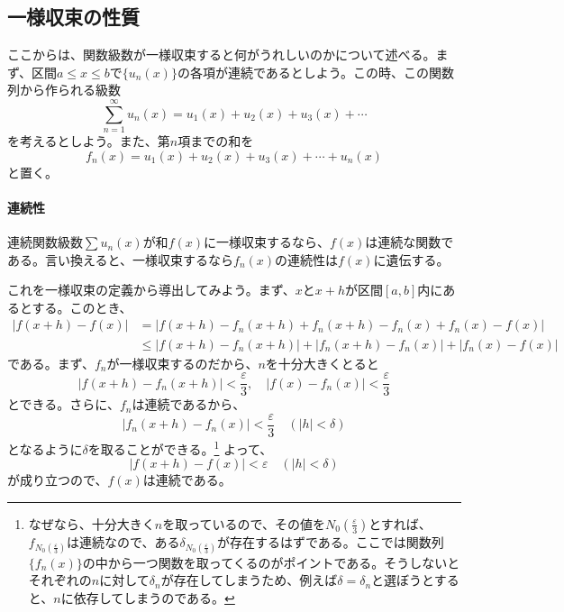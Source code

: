 \documentclass[a4j,dvipdfmx]{jsarticle}
\begin{document}
            \subsection{一様収束の性質}
                ここからは、関数級数が一様収束すると何がうれしいのかについて述べる。まず、区間$a\leq x\leq b$で$\{u_n(x)\}$の各項が連続であるとしよう。この時、この関数列から作られる級数
                \begin{equation*}
                    \sum_{n=1}^{\infty}u_n(x)=u_1(x)+u_2(x)+u_3(x)+\cdots
                \end{equation*}
                を考えるとしよう。また、第$n$項までの和を
                \begin{equation*}
                    f_n(x)=u_1(x)+u_2(x)+u_3(x)+\cdots +u_n(x)
                \end{equation*}
                と置く。

                \paragraph{連続性}連続関数級数$\sum u_n(x)$が和$f(x)$に一様収束するなら、$f(x)$は連続な関数である。言い換えると、一様収束するなら$f_n(x)$の連続性は$f(x)$に遺伝する。

                これを一様収束の定義から導出してみよう。まず、$x$と$x+h$が区間$[a,b]$内にあるとする。このとき、
                \begin{align*}
                    |f(x+h)-f(x)|&=|f(x+h)-f_n(x+h)+f_n(x+h)-f_n(x)+f_n(x)-f(x)|\\ &\leq |f(x+h)-f_n(x+h)|+|f_n(x+h)-f_n(x)|+|f_n(x)-f(x)|
                \end{align*}
                である。まず、$f_n$が一様収束するのだから、$n$を十分大きくとると
                \begin{equation*}
                    |f(x+h)-f_n(x+h)|<\frac{\varepsilon}{3},\quad |f(x)-f_n(x)|<\frac{\varepsilon}{3}
                \end{equation*}
                とできる。さらに、$f_n$は連続であるから、
                \begin{equation*}
                    |f_n(x+h)-f_n(x)|<\frac{\varepsilon}{3}\quad (|h|<\delta)
                \end{equation*}
                となるように$\delta$を取ることができる。\footnote{なぜなら、十分大きく$n$を取っているので、その値を$N_0(\frac{\varepsilon}{3})$とすれば、$f_{N_0(\frac{\varepsilon}{3})}$は連続なので、ある$\delta_{N_0(\frac{\varepsilon}{3})}$が存在するはずである。ここでは関数列$\{f_n(x)\}$の中から一つ関数を取ってくるのがポイントである。そうしないとそれぞれの$n$に対して$\delta_n$が存在してしまうため、例えば$\delta=\delta_n$と選ぼうとすると、$n$に依存してしまうのである。}
                よって、
                \begin{equation*}
                    |f(x+h)-f(x)|<\varepsilon \quad (|h|<\delta)
                \end{equation*}
                が成り立つので、$f(x)$は連続である。
\end{document}
